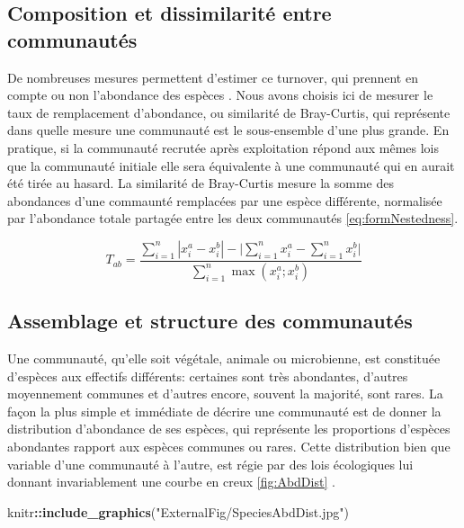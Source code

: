 \documentclass[
  11pt,
  french,
  A4paper,
  extrafontsizes,onecolumn,openright
  ]{memoir}
\newenvironment{Shaded}{\begin{snugshade}}{\end{snugshade}}
\newcommand{\KeywordTok}[1]{\textcolor[rgb]{0.13,0.29,0.53}{\textbf{#1}}}
\newcommand{\StringTok}[1]{\textcolor[rgb]{0.31,0.60,0.02}{#1}}
\newcommand{\OperatorTok}[1]{\textcolor[rgb]{0.81,0.36,0.00}{\textbf{#1}}}
\newcommand{\NormalTok}[1]{#1}
\begin{document}
\subsection{Composition et dissimilarité entre
communautés}\label{composition-et-dissimilarite-entre-communautes}

De nombreuses mesures permettent d'estimer ce turnover, qui prennent en
compte ou non l'abondance des espèces \autocite{Podani2013}. Nous avons
choisis ici de mesurer le taux de remplacement d'abondance, ou
similarité de Bray-Curtis, qui représente dans quelle mesure une
communauté est le sous-ensemble d'une plus grande. En pratique, si la
communauté recrutée après exploitation répond aux mêmes lois que la
communauté initiale elle sera équivalente à une communauté qui en aurait
été tirée au hasard. La similarité de Bray-Curtis mesure la somme des
abondances d'une commaunté remplacées par une espèce différente,
normalisée par l'abondance totale partagée entre les deux communautés
\eqref{eq:formNestedness}.

\begin{equation}
T_{ab}=\frac{\sum_{i=1}^{n}|x_i^a - x_i^b| - \bigg| \sum_{i=1}^{n}{x_i^a} - \sum_{i=1}^{n}{x_i^b} \bigg|}{\sum_{i=1}^{n}\max{\left( x_i^a;x_i^b \right)}}
\label{eq:formNestedness}
\end{equation}

\subsection{Assemblage et structure des
communautés}\label{AbundanceDistribution}

Une communauté, qu'elle soit végétale, animale ou microbienne, est
constituée d'espèces aux effectifs différents: certaines sont très
abondantes, d'autres moyennement communes et d'autres encore, souvent la
majorité, sont rares. La façon la plus simple et immédiate de décrire
une communauté est de donner la distribution d'abondance de ses espèces,
qui représente les proportions d'espèces abondantes rapport aux espèces
communes ou rares. Cette distribution bien que variable d'une communauté
à l'autre, est régie par des lois écologiques lui donnant invariablement
une courbe en creux \ref{fig:AbdDist} \autocite{McGill2007}.

\begin{Shaded}
\begin{Highlighting}[]
\NormalTok{knitr}\OperatorTok{::}\KeywordTok{include_graphics}\NormalTok{(}\StringTok{"ExternalFig/SpeciesAbdDist.jpg"}\NormalTok{)}
\end{Highlighting}
\end{Shaded}
\end{document}
